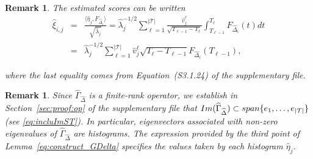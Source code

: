 \documentclass[aos]{imsart}
\theoremstyle{plain}
\newtheorem{remark}[theorem]{Remark}
\theoremstyle{remark}
\newcommand{\1}{1}
\begin{document}
\begin{remark}
The estimated scores can be written
\begin{eqnarray*}
\widehat\xi_{i,j}&=&\frac{\langle \widehat\eta_j,F_{\widehat\Delta_i}\rangle}{\sqrt{\widehat\lambda_j}}=\widehat\lambda_j^{-1/2}\sum_{\ell=1}^{|\mathcal T|}\frac{\widehat v_j^\ell}{\sqrt{T_{\ell-1}-T_\ell}} \int_{T_{\ell-1}}^{T_\ell}F_{\widehat\Delta_i}(t)dt\\
&=&	\widehat\lambda_j^{-1/2}\sum_{\ell=1}^{|\mathcal{T}|}\widehat v_j^\ell \sqrt{T_\ell-T_{\ell-1}}F_{\widehat\Delta_i}(T_{\ell-1}),
\end{eqnarray*}

where the last equality comes from Equation~(S3.1.24) of the supplementary file.
\end{remark}
\begin{remark}
Since $\widehat\Gamma_{\widehat\Delta}$ is a finite-rank operator, we establish in Section~\ref{sec:proof:op} of the supplementary file that ${\rm Im}(\widehat\Gamma_{\widehat\Delta})\subset{\rm span}\{e_1,\hdots,e_{|\mathcal T|} \}$ (see \eqref{eq:incluImST}). In particular, eigenvectors associated with non-zero eigenvalues of $\widehat\Gamma_{\widehat\Delta}$ are histograms. The expression provided by the third point of Lemma~\ref{eq:construct_GDelta} specifies the values taken by each histogram $
	\widehat\eta_j$.
\end{remark}
\end{document}
